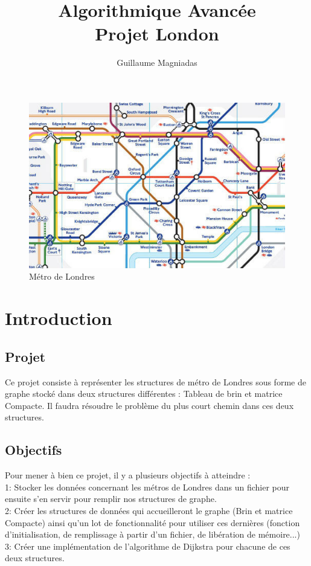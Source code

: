 \documentclass[11pt]{article}
\title{\textbf{Algorithmique Avancée}\\Projet London}
\author{Guillaume Magniadas}
\date{}
\begin{document}
\maketitle
\begin{figure}[htp]
\centering
\includegraphics[scale=0.75]{plan-metro-londres-centre.jpg}
\caption{Métro de Londres}

\label{}
\end{figure}

\newpage
\tableofcontents
\newpage

	\section{Introduction}
	\subsection{Projet}
Ce projet consiste à représenter les structures de métro de Londres sous forme de graphe stocké dans deux structures différentes : Tableau de brin et matrice Compacte. Il faudra résoudre le problème du plus court chemin dans ces deux structures.
	\subsection{Objectifs}
Pour mener à bien ce projet, il y a plusieurs objectifs à atteindre :\\1: Stocker les données concernant les métros de Londres dans un fichier pour ensuite s'en servir pour remplir nos structures de graphe.\\2: Créer les structures de données qui accueilleront le graphe (Brin et matrice Compacte) ainsi qu'un lot de fonctionnalité pour utiliser ces dernières (fonction d'initialisation, de remplissage à partir d'un fichier, de libération de mémoire...)\\3: Créer une implémentation de l'algorithme de Dijkstra pour chacune de ces deux structures.
\end{document}
